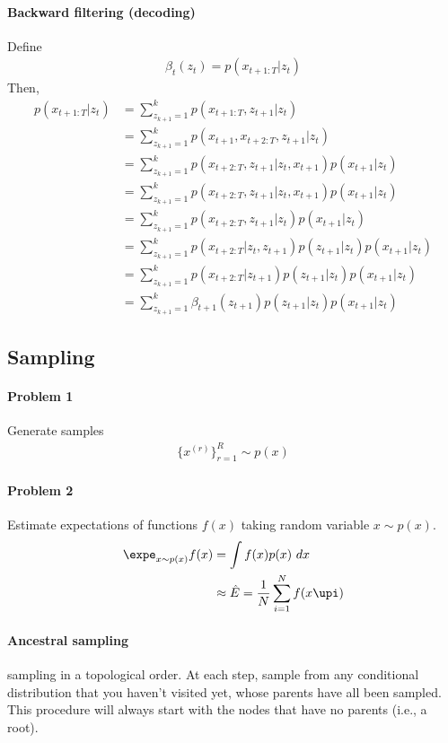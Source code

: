 \documentclass{article}
\begin{document}
	\paragraph{Backward filtering (decoding)}
	Define
	\begin{align}
		\beta_t(z_t) = p(x_{t+1:T}|z_t)
	\end{align}
	Then,
	\begin{align}
		p(x_{t+1:T}|z_t)
		&= \sum_{z_{k+1}=1}^k p(x_{t+1:T}, z_{t+1}|z_t) \\
		&= \sum_{z_{k+1}=1}^k p(x_{t+1}, x_{t+2:T}, z_{t+1}|z_t) \\
		&= \sum_{z_{k+1}=1}^k p(x_{t+2:T}, z_{t+1}|z_t, x_{t+1}) p(x_{t+1}|z_t) \\
		&= \sum_{z_{k+1}=1}^k p(x_{t+2:T}, z_{t+1}|z_t, x_{t+1}) p(x_{t+1}|z_t) \\
		&= \sum_{z_{k+1}=1}^k p(x_{t+2:T}, z_{t+1}|z_t) p(x_{t+1}|z_t) \\
		&= \sum_{z_{k+1}=1}^k p(x_{t+2:T}|z_t, z_{t+1}) p(z_{t+1}|z_t) p(x_{t+1}|z_t) \\
		&= \sum_{z_{k+1}=1}^k p(x_{t+2:T}|z_{t+1}) p(z_{t+1}|z_t) p(x_{t+1}|z_t) \\
		&= \sum_{z_{k+1}=1}^k \beta_{t+1}(z_{t+1}) p(z_{t+1}|z_t) p(x_{t+1}|z_t)
	\end{align}

	\subsection{Sampling}
	\paragraph{Problem 1} Generate samples
	\begin{align}
		\{x^{(r)}\}_{r=1}^R \sim p(x)
	\end{align}
	
	\paragraph{Problem 2} Estimate expectations of functions $f(x)$ taking random variable $x \sim p(x)$.
	\begin{align}
		\expe_{x \sim p(x)} f(x) &= \int f(x) p(x)\ dx \\
		&\approx \hat{E} = \frac{1}{N} \sum_{i=1}^N f(x\upi)
	\end{align}
	
	\paragraph{Ancestral sampling} sampling in a topological order. At each step, sample from any conditional distribution that you haven't visited yet, whose parents have all been sampled. This procedure will always start with the nodes that have no parents (i.e., a root).
	
\end{document}
